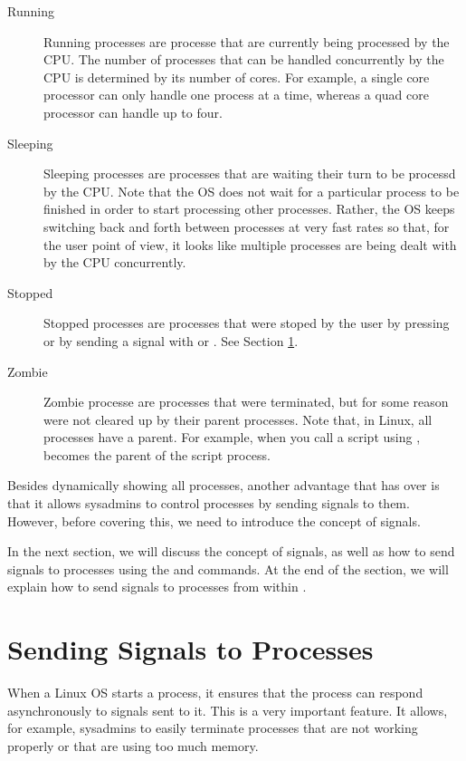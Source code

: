 \begin{description}
\item[Running] Running processes are processe that are currently being processed by the CPU. The number of processes that can be handled concurrently by the CPU is determined by its number of cores. For example, a single core processor can only handle one process at a time, whereas a quad core processor can handle up to four.
\item[Sleeping] Sleeping processes are processes that are waiting their turn to be processd by the CPU. Note that the \acs{OS} does not wait for a particular process to be finished in order to start processing other processes. Rather, the \acs{OS} keeps switching back and forth between processes at very fast rates so that, for the user point of view, it looks like multiple processes are being dealt with by the CPU concurrently.
\item[Stopped] Stopped processes are processes that were stoped by the user by pressing  or by sending a  signal with  or . See Section \ref{sec:signals}.
\item[Zombie] Zombie processe are processes that were terminated, but for some reason were not cleared up by their parent processes. Note that, in Linux, all processes have a parent. For example, when you call a script using ,  becomes the parent of the script process.
\end{description}

Besides dynamically showing all processes, another advantage that  has over  is that it allows sysadmins to control processes by sending signals to them. However, before covering this, we need to introduce the concept of signals.

In the next section, we will discuss the concept of signals, as well as how to send signals to processes using the  and  commands. At the end of the section, we will explain how to send signals to processes from within . 

\section{Sending Signals to Processes}
\label{sec:signals}
When a Linux \acs{OS} starts a process, it ensures that the process can respond asynchronously to signals sent to it. This is a very important feature.  It allows, for example, sysadmins to easily terminate processes that are not working properly or that are using too much memory.


